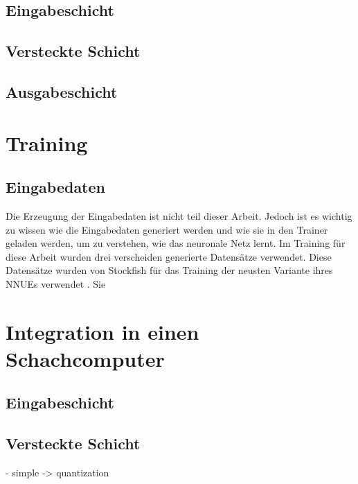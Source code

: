 \subsection{Eingabeschicht}


\subsection{Versteckte Schicht}
\subsection{Ausgabeschicht}


\section{Training}

\subsection{Eingabedaten}

Die Erzeugung der Eingabedaten ist nicht teil dieser Arbeit. Jedoch ist es wichtig zu wissen wie die Eingabedaten generiert werden und wie sie in den Trainer geladen werden, um zu verstehen, wie das neuronale Netz lernt. Im Training für diese Arbeit wurden drei verscheiden generierte Datensätze verwendet. Diese Datensätze wurden von Stockfish für das Training der neusten Variante ihres \acp{NNUE} verwendet \cite{StockfishNewestNetJul04}. Sie 




\section{Integration in einen Schachcomputer}

\subsection{Eingabeschicht}


\subsection{Versteckte Schicht}
- simple -> quantization